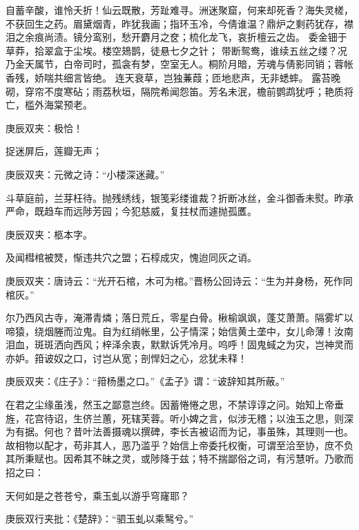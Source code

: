 \begin{qute2sp}
\begin{parag}
        自蓄辛酸，谁怜夭折！仙云既散，芳趾难寻。洲迷聚窟，何来却死香？海失灵槎，不获回生之药。眉黛烟青，昨犹我画；指环玉冷，今倩谁温？鼎炉之剩药犹存，襟泪之余痕尚渍。镜分鸾别，愁开麝月之奁；梳化龙飞，哀折檀云之齿。
        委金钿于草莽，拾翠盒于尘埃。楼空鳷鹊，徒悬七夕之针；
        带断鸳鸯，谁续五丝之缕？况乃金天属节，白帝司时，孤衾有梦，空室无人。桐阶月暗，芳魂与倩影同销；蓉帐香残，娇喘共细言皆绝。
        连天衰草，岂独蒹葭；匝地悲声，无非蟋蟀。
        露苔晚砌，穿帘不度寒砧；雨荔秋垣，隔院希闻怨笛。芳名未泯，檐前鹦鹉犹呼；艳质将亡，槛外海棠预老。
        \begin{note}庚辰双夹：极恰！\end{note}
        捉迷屏后，莲瓣无声；
        \begin{note}庚辰双夹：元微之诗：“小楼深迷藏。”\end{note}
        斗草庭前，兰芽枉待。抛残绣线，银笺彩缕谁裁？折断冰丝，金斗御香未熨。昨承严命，既趋车而远陟芳园；今犯慈威，复拄杖而遽抛孤匶。\begin{note}庚辰双夹：柩本字。
        \end{note}及闻槥棺被燹，惭违共穴之盟；石椁成灾，愧迨同灰之诮。
        \begin{note}庚辰双夹：唐诗云：“光开石棺，木可为棺。”晋杨公回诗云：“生为并身杨，死作同棺灰。”\end{note}
        尔乃西风古寺，淹滞青燐；落日荒丘，零星白骨。楸榆飒飒，蓬艾萧萧。隔雾圹以啼猿，绕烟塍而泣鬼。自为红绡帐里，公子情深；始信黄土垄中，女儿命薄！汝南泪血，斑斑洒向西风；梓泽余衷，默默诉凭冷月。呜呼！固鬼蜮之为灾，岂神灵而亦妒。箝诐奴之口，讨岂从宽；剖悍妇之心，忿犹未释！
        \begin{note}庚辰双夹：《庄子》：“箝杨墨之口。”《孟子》谓：“诐辞知其所蔽。”\end{note}
        在君之尘缘虽浅，然玉之鄙意岂终。因蓄惓惓之思，不禁谆谆之问。始知上帝垂旌，花宫待诏，生侪兰蕙，死辖芙蓉。听小婢之言，似涉无稽；以浊玉之思，则深为有据。何也？昔叶法善摄魂以撰碑，李长吉被诏而为记，事虽殊，其理则一也。故相物以配才，苟非其人，恶乃滥乎？始信上帝委托权衡，可谓至洽至协，庶不负其所秉赋也。因希其不昧之灵，或陟降于兹；特不揣鄙俗之词，有污慧听。乃歌而招之曰：
    \end{parag}


    \begin{poem}
        \begin{pl}天何如是之苍苍兮，乘玉虬以游乎穹窿耶？\end{pl}
        \begin{note}庚辰双行夹批：《楚辞》：“驷玉虬以乘鹥兮。”\end{note}


\end{poem}
\end{qute2sp}
